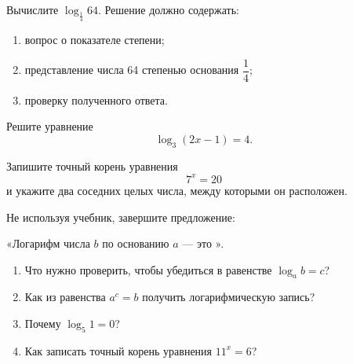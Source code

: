 \begin{practicebox}[Задание 1]
  Вычислите \(\log_{\frac14}64\). Решение должно содержать:
  \begin{enumerate}
    \item вопрос о показателе степени;
    \item представление числа 64 степенью основания \(\dfrac14\);
    \item проверку полученного ответа.
  \end{enumerate}
  \workarea{48mm}
\end{practicebox}

\begin{practicebox}[Задание 2]
  Решите уравнение
  \[
    \log_3(2x-1)=4.
  \]
  \workarea{40mm}
\end{practicebox}

\begin{practicebox}[Задание 3]
  Запишите точный корень уравнения
  \[
    7^x=20
  \]
  и укажите два соседних целых числа, между которыми он расположен.
  \workarea{38mm}
\end{practicebox}

\begin{reflectionbox}
  Не используя учебник, завершите предложение:

  «Логарифм числа \(b\) по основанию \(a\) --- это
  \answerblank[98mm]».
\end{reflectionbox}

\begin{questionsbox}
  \begin{enumerate}
    \item Что нужно проверить, чтобы убедиться в равенстве \(\log_a b=c\)?
    \item Как из равенства \(a^c=b\) получить логарифмическую запись?
    \item Почему \(\log_5 1=0\)?
    \item Как записать точный корень уравнения \(11^x=6\)?
  \end{enumerate}
\end{questionsbox}
